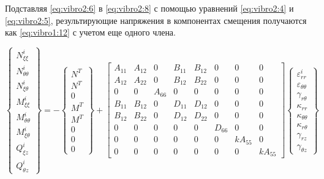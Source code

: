 Подставляя \cref{eq:vibro2:6} в \cref{eq:vibro2:8} с помощью уравнений \cref{eq:vibro2:4} и \cref{eq:vibro2:5}, результирующие напряжения в компонентах смещения получаются как \cref{eq:vibro1:12} с учетом еще одного члена.

\begin{equation}
	\label{eq:vibro2:9}
	\begin{Bmatrix}
		N_{\xi \xi}^{i}\\
		N_{\theta \theta}^{i} \\
		N_{\xi \theta}^{i} \\
		M_{\xi \xi}^{i} \\
		M_{\theta \theta}^{i}\\
		M_{\xi \theta}^{i}\\
		Q_{\xi z}^{i}\\
		Q_{\theta z}^{i}	
	\end{Bmatrix} =
	-
		\begin{Bmatrix}
		N^{T}\\
		N^{T} \\
		0\\
		M^{T}\\
		M^{T}\\
		0\\
		0\\
		0	
	\end{Bmatrix}
	+
	\begin{bmatrix}
		A_{11} & A_{12} & 0 & B_{11} & B_{12} & 0 & 0 & 0 \\
		A_{12} & A_{22} & 0 & B_{12} & B_{22} & 0 & 0 & 0 \\
		0 & 0 & A_{66} & 0 & 0 & 0 & 0 & 0 \\
		B_{11} & B_{12} & 0 & D_{11} & D_{12} & 0 & 0 & 0 \\
		B_{12} & B_{22} & 0 & D_{12} & D_{22} & 0 & 0 & 0 \\
		0 & 0 & 0 & 0 & 0 & D_{66} & 0 & 0 \\
		0 & 0 & 0 & 0 & 0 & 0 & k A_{55} & 0 \\
		0 & 0 & 0 & 0 & 0 & 0 & 0 & k A_{55}
	\end{bmatrix}
	\begin{Bmatrix}
		\varepsilon_{rr}^{i}\\
		\varepsilon_{\theta \theta} \\
		\gamma_{r \theta} \\
		\kappa_{r r} \\
		\kappa_{\theta \theta}\\
		\kappa_{r \theta}\\
		\gamma_{r z }\\
		\gamma_{\theta z}
	\end{Bmatrix}
\end{equation}


